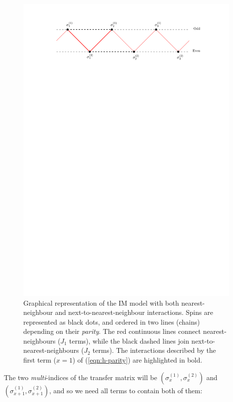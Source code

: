 \documentclass[12pt,a4paper]{report}
\begin{document}
\begin{figure}[H]
    \centering
    \includegraphics{nnn.pdf}
    \caption{Graphical representation of the IM model with both nearest-neighbour and next-to-nearest-neighbour interactions. Spins are represented as black dots, and ordered in two lines (chains) depending on their \textit{parity}. The red continuous lines connect nearest-neighbours ($J_1$ terms), while the black dashed lines join next-to-nearest-neighbours ($J_2$ terms). The interactions described by the first term ($x=1$) of (\ref{eqn:h-parity}) are highlighted in bold.\label{fig:next-nearest-model}}
\end{figure}


The two \textit{multi}-indices of the transfer matrix will be $(\sigma_x^{(1)}, \sigma_x^{(2)})$ and $(\sigma_{x+1}^{(1)}, \sigma_{x+1}^{(2)})$, and so we need all terms to contain both of them:
\end{document}
